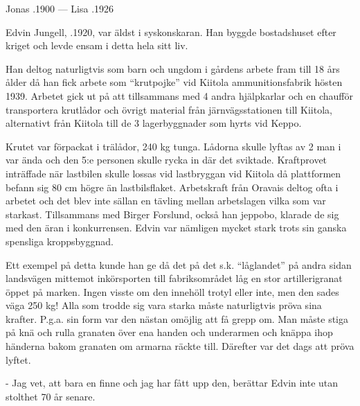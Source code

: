 Jonas .1900  ---   Lisa .1926



%



%
Edvin Jungell, .1920, var äldst i syskonskaran. Han byggde bostadshuset efter kriget och levde ensam i detta hela sitt liv.

Han deltog naturligtvis som barn och ungdom i gårdens arbete fram till 18 års ålder då han fick arbete som ``krutpojke'' vid Kiitola ammunitionsfabrik hösten 1939. Arbetet gick ut på att tillsammans med 4 andra hjälpkarlar och en chaufför transportera krutlådor och övrigt material från järnvägsstationen till Kiitola, alternativt från Kiitola till de 3 lagerbyggnader som hyrts vid Keppo.

Krutet var förpackat i trälådor, 240 kg tunga. Lådorna skulle lyftas av 2 man i var ända och den 5:e personen skulle rycka in där det sviktade. Kraftprovet inträffade när lastbilen skulle lossas vid lastbryggan vid Kiitola då plattformen befann sig 80 cm högre än lastbilsflaket. Arbetskraft från Oravais deltog ofta i arbetet och det blev inte sällan en tävling mellan arbetslagen vilka som var starkast. Tillsammans med Birger Forslund, också han jeppobo, klarade de sig med den äran i konkurrensen. Edvin var nämligen mycket stark trots sin ganska spensliga kroppsbyggnad.

Ett exempel på detta kunde han ge då det på det s.k. ``låglandet'' på andra sidan landsvägen mittemot inkörsporten till fabriksområdet låg en stor artillerigranat öppet på marken. Ingen visste om den innehöll trotyl eller inte, men den sades väga 250 kg! Alla som trodde sig vara starka måste naturligtvis pröva sina krafter. P.g.a. sin form var den nästan omöjlig att få grepp om. Man måste stiga på knä och rulla granaten över ena handen och underarmen och knäppa ihop händerna bakom granaten om armarna räckte till. Därefter var det dags att pröva lyftet.

- Jag vet, att bara en finne och jag har fått upp den, berättar Edvin inte utan stolthet 70 år senare.


